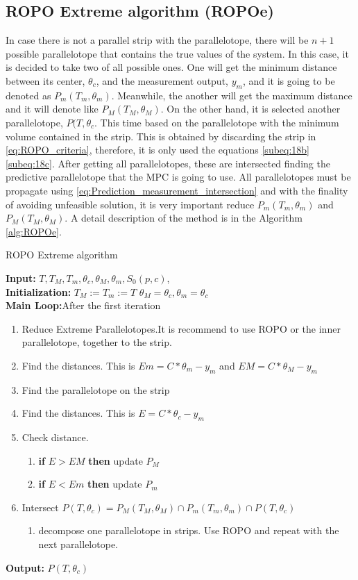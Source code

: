 \documentclass{ifacconf}
\begin{document}
\subsection{ROPO Extreme algorithm (ROPOe)}
In case there is not a parallel strip with the parallelotope, there will be $n+1$ possible parallelotope that contains the true values of the system. In this case, it is decided to take two of all possible ones. One will get the minimum distance between its center, $\theta_{c}$, and the measurement output, $y_{m}$, and it is going to be denoted as $P_{m}(T_{m},\theta_m)$. Meanwhile, the another will get the maximum distance and it will denote like $P_{M}(T_{M},\theta_M)$. On the other hand, it is selected another parallelotope, $P(T,\theta_{c}$. This time based on the parallelotope with the minimum volume contained in the strip. This is obtained by discarding the strip in \ref{eq:ROPO_criteria}, therefore, it is only used the equations \ref{subeq:18b} \ref{subeq:18c}. After getting all parallelotopes, these are intersected finding the predictive parallelotope that the MPC is going to use. All parallelotopes must be propagate using \ref{eq:Prediction_measurement_intersection} and with the finality of avoiding unfeasible solution, it is very important reduce $P_{m}(T_{m},\theta_m)$ and $P_{M}(T_{M},\theta_M)$. A detail description of the method is in the Algorithm \ref{alg:ROPOe}.
\begin{algorithm}
\caption{ROPO Extreme algorithm}
\label{alg:ROPOe}
\textbf{Input:} $T,T_{M},T_{m}, \theta_c,\theta_{M},\theta_{m}, S_{0}(p,c)$,\\
\textbf{Initialization:} $T_{M}:=T_{m}:=T$ $\theta_{M}=\theta_c,\theta_{m}=\theta_c$\\
\textbf{Main Loop:}After the first iteration
\begin{enumerate}
\label{en:paramb}
\item Reduce Extreme Parallelotopes.It is recommend to use ROPO or the inner parallelotope, together to the strip.
\item Find the distances. This is $Em=C*\theta_{m}-y_{m}$ and $EM=C*\theta_{M}-y_{m}$
\item Find the parallelotope on the strip
\item Find the distances. This is $E=C*\theta_{c}-y_{m}$
\item Check distance. 
\begin{enumerate}
	\item \textbf{if} $E>EM$ \textbf{then} update $P_{M}$
	\item \textbf{if} $E<Em$ \textbf{then} update $P_{m}$	
\end{enumerate}
\item Intersect $P(T,\theta_c) = P_{M}(T_{M},\theta_M) \cap P_{m}(T_{m},\theta_m)\cap P(T,\theta_c)$
\begin{enumerate}
\item decompose one parallelotope in strips. Use ROPO and repeat with the next parallelotope. 
\end{enumerate}
\end{enumerate}
\textbf{Output:} $P(T,\theta_c)$
\end{algorithm}
\label{subsec:ROPOm}
\end{document}
